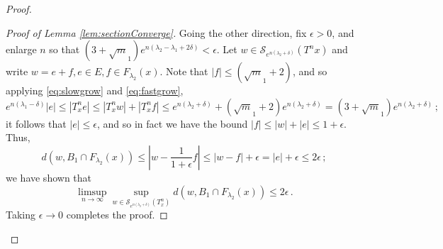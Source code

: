 \documentclass[11pt]{amsart}
\theoremstyle{theorem}
\theoremstyle{definition}
\numberwithin{equation}{section}
\renewcommand{\d}{\delta}
\newcommand{\e}{\epsilon}
\renewcommand{\l}{\lambda}
\newcommand{\Sc}{\mathcal{S}}
\begin{document}
\begin{proof}
\begin{proof}[Proof of Lemma \ref{lem:sectionConverge}]
Going the other direction, fix $\e > 0$, and enlarge $n$ so that $(3 + \sqrt m_1) e^{n (\l_2 - \l_1 + 2 \d)} < \e$. Let $w \in \Sc_{e^{n(\l_2  + \d)}}(T^n x)$ and write $w = e + f, e \in E, f \in F_{\l_2}(x)$. Note that $|f| \leq (\sqrt m_1 + 2)$, and so applying \eqref{eq:slowgrow} and \eqref{eq:fastgrow},
\[
e^{n (\l_1 - \d)} |e| \leq |T^n_x e| \leq |T^n_x w| + |T^n_x f| \leq e^{n (\l_2 + \d)}  + (\sqrt m_1 + 2)e^{n (\l_2 + \d)} = (3 + \sqrt m_1) e^{n (\l_2 + \d)} \, ;
\]
it follows that $|e| \leq \e$, and so in fact we have the bound $|f| \leq |w| + |e| \leq 1 + \e$. Thus,
\[
d(w, B_1 \cap F_{\l_2}(x))  \leq |w - \frac{1}{1 + \e} f| \leq |w - f| + \e = |e| + \e \leq 2 \e \, ;
\]
we have shown that
\[
\limsup_{n \to \infty} \sup_{w \in \Sc_{e^{n(\l_2  + \d)}}(T^n_x)} d(w, B_1 \cap F_{\l_2}(x)) \leq 2 \e \, .
\]
Taking $\e \to 0$ completes the proof.
\end{proof}
\end{proof}




\end{document}
